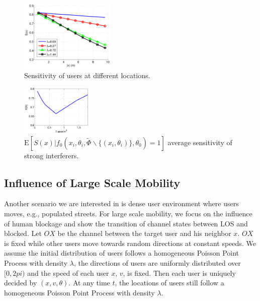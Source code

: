 \documentclass[10pt, conference, letterpaper]{IEEEtran}
\begin{document}
\begin{figure}
	\centering
	\includegraphics[width = 0.4\textwidth]{Channel_sensitivity.pdf}
	\caption{Sensitivity of users at different locations.}
	\label{fig:Channel_sensitivity}
\end{figure}
\begin{figure}
	\centering
	\includegraphics[width = 0.3\textwidth]{Channel_sensitivity_average.pdf}
	\caption{$\mathrm{E}[S(x)|f_0(x_i, \theta_i, \tilde{\Phi}\backslash\{(x_i,\theta_i)\}, \theta_0)=1]$ average sensitivity of strong interferers.}
	\label{fig:Channel_sensitivity_average}
\end{figure}


\subsection{Influence of Large Scale Mobility}\label{subsection:largemobility}
Another scenario we are interested in is dense user environment where users moves, e.g., populated streets. For large scale mobility, we focus on the influence of human blockage and show the transition of channel states between LOS and blocked. Let ${OX}$ be the channel between the target user and his neighbor $x$. ${OX}$ is fixed while other users move towards random directions at constant speeds. We assume the initial distribution of users follows a homogeneous Poisson Point Process with density $\lambda$, the directions of users are uniformly distributed over $[0,2pi)$ and the speed of each user $x$, $v$, is fixed. Then each user is uniquely decided by $(x, v, \theta)$. At any time $t$, the locations of users still follow a homogeneous Poisson Point Process with density $\lambda$.
\end{document}
